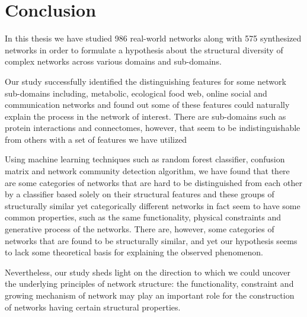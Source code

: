 \section*{Conclusion}
 In this thesis we have studied 986 real-world networks along with 575 synthesized networks in order to formulate a hypothesis about the structural diversity of complex networks across various domains and sub-domains.
 
  Our study successfully identified the distinguishing features for some network sub-domains including, metabolic, ecological food web, online social and communication networks and found out some of these features could naturally explain the process in the network of interest. There are sub-domains such as protein interactions and connectomes, however, that seem to be indistinguishable from others with a set of features we have utilized 
  
  Using machine learning techniques such as random forest classifier, confusion matrix and network community detection algorithm, we have found that there are some categories of networks that are hard to be distinguished from each other by a classifier based solely on their structural features and these groups of structurally similar yet categorically different networks in fact seem to have some common properties, such as the same functionality, physical constraints and generative process of the networks. There are, however, some categories of networks that are found to be structurally similar, and yet our hypothesis seems to lack some theoretical basis for explaining the observed phenomenon.
 
 Nevertheless, our study sheds light on the direction to which we could uncover the underlying principles of network structure: the functionality, constraint and growing mechanism of network may play an important role for the construction of networks having certain structural properties.
 